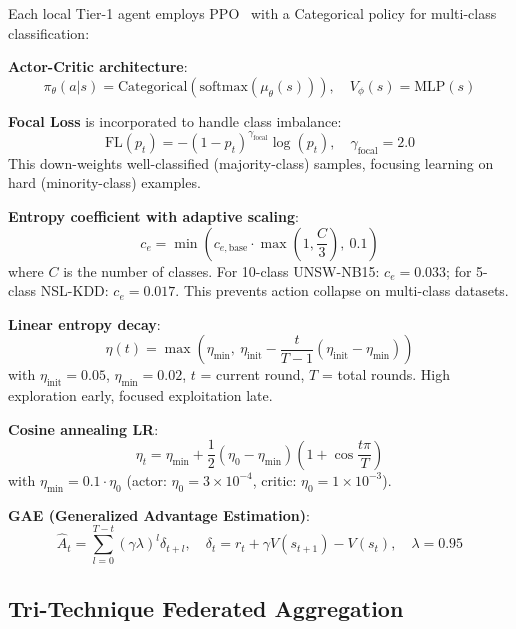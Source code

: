 \documentclass[conference]{IEEEtran}
\begin{document}
Each local Tier-1 agent employs PPO~\cite{rlintro} with a Categorical policy for multi-class classification:

\textbf{Actor-Critic architecture}:
\begin{equation}
\pi_\theta(a|s) = \mathrm{Categorical}(\mathrm{softmax}(\mu_\theta(s))), \quad V_\phi(s) = \mathrm{MLP}(s)
\end{equation}

\textbf{Focal Loss} is incorporated to handle class imbalance:
\begin{equation}
\mathrm{FL}(p_t) = -(1 - p_t)^{\gamma_{\mathrm{focal}}} \log(p_t), \quad \gamma_{\mathrm{focal}} = 2.0
\end{equation}
This down-weights well-classified (majority-class) samples, focusing learning on hard (minority-class) examples.

\textbf{Entropy coefficient with adaptive scaling}:
\begin{equation}
c_e = \min\!\left(c_{e,\mathrm{base}} \cdot \max\!\left(1, \frac{C}{3}\right),\ 0.1\right)
\end{equation}
where $C$ is the number of classes. For 10-class UNSW-NB15: $c_e = 0.033$; for 5-class NSL-KDD: $c_e = 0.017$. This prevents action collapse on multi-class datasets.

\textbf{Linear entropy decay}:
\begin{equation}
\eta(t) = \max\!\left(\eta_{\min},\ \eta_{\mathrm{init}} - \frac{t}{T-1}\left(\eta_{\mathrm{init}} - \eta_{\min}\right)\right)
\end{equation}
with $\eta_{\mathrm{init}}=0.05$, $\eta_{\min}=0.02$, $t$ = current round, $T$ = total rounds. High exploration early, focused exploitation late.

\textbf{Cosine annealing LR}:
\begin{equation}
\eta_t = \eta_{\min} + \frac{1}{2}(\eta_0 - \eta_{\min})\left(1 + \cos\frac{t\pi}{T}\right)
\end{equation}
with $\eta_{\min} = 0.1 \cdot \eta_0$ (actor: $\eta_0=3\times10^{-4}$, critic: $\eta_0=1\times10^{-3}$).

\textbf{GAE (Generalized Advantage Estimation)}:
\begin{equation}
\hat{A}_t = \sum_{l=0}^{T-t} (\gamma\lambda)^l \delta_{t+l}, \quad \delta_t = r_t + \gamma V(s_{t+1}) - V(s_t), \quad \lambda = 0.95
\end{equation}

\subsection{Tri-Technique Federated Aggregation}
\label{sec:aggregation}
\end{document}
